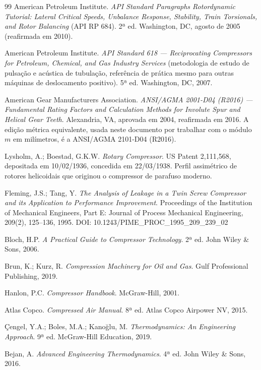 \documentclass[12pt,a4paper]{article}
\numberwithin{equation}{section}
\numberwithin{table}{section}
\numberwithin{figure}{section}
\begin{document}
\begin{thebibliography}{99}
 American Petroleum Institute. \textit{API Standard Paragraphs Rotordynamic Tutorial: Lateral Critical Speeds, Unbalance Response, Stability, Train Torsionals, and Rotor Balancing} (API RP 684). 2ª ed. Washington, DC, agosto de 2005 (reafirmada em 2010).

 American Petroleum Institute. \textit{API Standard 618 — Reciprocating Compressors for Petroleum, Chemical, and Gas Industry Services} (metodologia de estudo de pulsação e acústica de tubulação, referência de prática mesmo para outras máquinas de deslocamento positivo). 5ª ed. Washington, DC, 2007.

 American Gear Manufacturers Association. \textit{ANSI/AGMA 2001-D04 (R2016) — Fundamental Rating Factors and Calculation Methods for Involute Spur and Helical Gear Teeth}. Alexandria, VA, aprovada em 2004, reafirmada em 2016. A edição métrica equivalente, usada neste documento por trabalhar com o módulo $m$ em milímetros, é a ANSI/AGMA 2101-D04 (R2016).

 Lysholm, A.; Boestad, G.K.W. \textit{Rotary Compressor}. US Patent 2,111,568, depositada em 10/02/1936, concedida em 22/03/1938. Perfil assimétrico de rotores helicoidais que originou o compressor de parafuso moderno.

 Fleming, J.S.; Tang, Y. \textit{The Analysis of Leakage in a Twin Screw Compressor and its Application to Performance Improvement}. Proceedings of the Institution of Mechanical Engineers, Part E: Journal of Process Mechanical Engineering, 209(2), 125–136, 1995. DOI: 10.1243/PIME\_PROC\_1995\_209\_239\_02

 Bloch, H.P. \textit{A Practical Guide to Compressor Technology}. 2ª ed. John Wiley \& Sons, 2006.

 Brun, K.; Kurz, R. \textit{Compression Machinery for Oil and Gas}. Gulf Professional Publishing, 2019.

 Hanlon, P.C. \textit{Compressor Handbook}. McGraw-Hill, 2001.

 Atlas Copco. \textit{Compressed Air Manual}. 8ª ed. Atlas Copco Airpower NV, 2015.

 Çengel, Y.A.; Boles, M.A.; Kano\u{g}lu, M. \textit{Thermodynamics: An Engineering Approach}. 9ª ed. McGraw-Hill Education, 2019.

 Bejan, A. \textit{Advanced Engineering Thermodynamics}. 4ª ed. John Wiley \& Sons, 2016.


\end{thebibliography}
\end{document}
